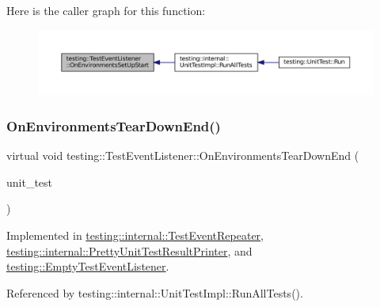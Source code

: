 Here is the caller graph for this function\+:
\nopagebreak
\begin{figure}[H]
\begin{center}
\leavevmode
\includegraphics[width=350pt]{classtesting_1_1TestEventListener_aa6502e534919605be45f26a6daf9a40c_icgraph}
\end{center}
\end{figure}
\mbox{\label{classtesting_1_1TestEventListener_a9ea04fa7f447865ba76df35e12ba2092}} 
\subsubsection{\texorpdfstring{On\+Environments\+Tear\+Down\+End()}{OnEnvironmentsTearDownEnd()}}
{\footnotesize\ttfamily virtual void testing\+::\+Test\+Event\+Listener\+::\+On\+Environments\+Tear\+Down\+End (\begin{DoxyParamCaption}\item[{const \hyperlink{classtesting_1_1UnitTest}{Unit\+Test} \&}]{unit\+\_\+test }\end{DoxyParamCaption})\hspace{0.3cm}{\ttfamily [pure virtual]}}



Implemented in \hyperlink{classtesting_1_1internal_1_1TestEventRepeater_a8428220c4cf9f0cea2dfd9a70f07ab7f}{testing\+::internal\+::\+Test\+Event\+Repeater}, \hyperlink{classtesting_1_1internal_1_1PrettyUnitTestResultPrinter_ab23094ef3b714778b2f742d39818c280}{testing\+::internal\+::\+Pretty\+Unit\+Test\+Result\+Printer}, and \hyperlink{classtesting_1_1EmptyTestEventListener_aea64c83c415b33a4c0b0239bafd1438d}{testing\+::\+Empty\+Test\+Event\+Listener}.



Referenced by testing\+::internal\+::\+Unit\+Test\+Impl\+::\+Run\+All\+Tests().


